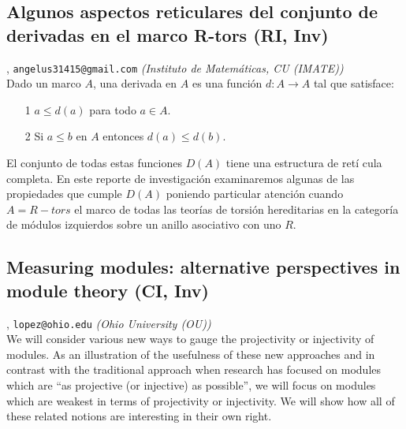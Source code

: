 \subsection{\sffamily Algunos aspectos reticulares del conjunto de derivadas en el marco R-tors {\footnotesize (RI, Inv)}} \label{reg-1460} 
, {\tt angelus31415@gmail.com}  {\slshape (Instituto de Matem\'aticas, CU (IMATE))}\\
          \noindent Dado un marco $A$, una derivada en $A$ es una funci\'on $d:A\rightarrow A$ tal que satisface:\begin{itemize}\item[1]$a\leq d(a)$ para todo $a\in A$.\item[2]Si $a\leq b$ en $A$ entonces $d(a)\leq d(b)$.\end{itemize}El conjunto de todas estas funciones $D(A)$ tiene una estructura de ret\'i cula completa. En este reporte de investigaci\'on examinaremos algunas de las propiedades que cumple $D(A)$ poniendo particular atenci\'on cuando $A=R-tors$ el marco de todas las teor\'ias de torsi\'on hereditarias en la categor\'ia de m\'odulos izquierdos sobre un anillo asociativo con uno $R$.
\subsection{\sffamily Measuring modules: alternative perspectives in module theory {\footnotesize (CI, Inv)}} \label{reg-1282} 
, {\tt lopez@ohio.edu}  {\slshape (Ohio University (OU))}\\
          \noindent We will consider various new ways to gauge the projectivity or injectivity of modules. As an illustration of the usefulness of these new approaches and in contrast with the traditional approach when research has focused on modules which are ``as projective (or injective) as possible'', we will focus on modules which are weakest in terms of projectivity or injectivity. We will show how all of these related notions are interesting in their own right.

